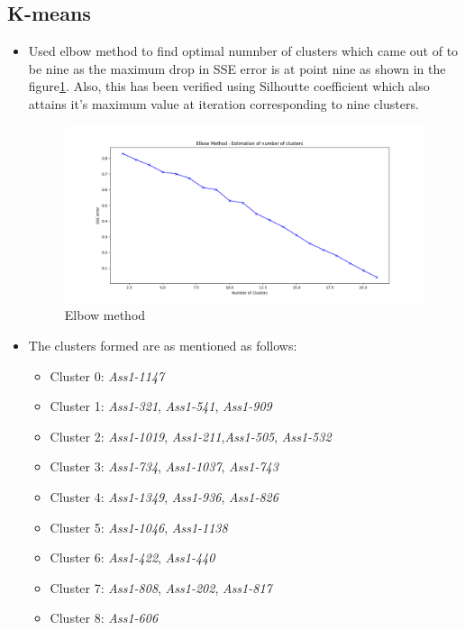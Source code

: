 \documentclass[7pt,a4paper]{article}
\begin{document}
\subsection{K-means}
\begin{itemize}
\item{Used elbow method to find optimal numnber of clusters which came out of to be nine as the maximum drop in SSE error is at point nine as shown in the figure\ref{elbow}. Also, this has been verified using Silhoutte coefficient which also attains it's maximum value at iteration corresponding to nine clusters.}

\begin{figure}[h]
\centering
\includegraphics[scale=.40]{elbow}
\caption{Elbow method}
\label{elbow}
\end{figure}

\item{The clusters formed are as mentioned as follows:}
\begin{itemize}
\item{Cluster 0: \textit{Ass1-1147}}
\item{Cluster 1: \textit{Ass1-321}, \textit{Ass1-541}, \textit{Ass1-909}}
\item{Cluster 2: \textit{Ass1-1019}, \textit{Ass1-211},\textit{Ass1-505}, \textit{Ass1-532}}
\item{Cluster 3: \textit{Ass1-734}, \textit{Ass1-1037}, \textit{Ass1-743}}
\item{Cluster 4: \textit{Ass1-1349}, \textit{Ass1-936}, \textit{Ass1-826}}
\item{Cluster 5: \textit{Ass1-1046}, \textit{Ass1-1138}}
\item{Cluster 6: \textit{Ass1-422}, \textit{Ass1-440}}
\item{Cluster 7: \textit{Ass1-808}, \textit{Ass1-202}, \textit{Ass1-817}}
\item{Cluster 8: \textit{Ass1-606}}
\end{itemize}
\end{itemize}
\end{document}
